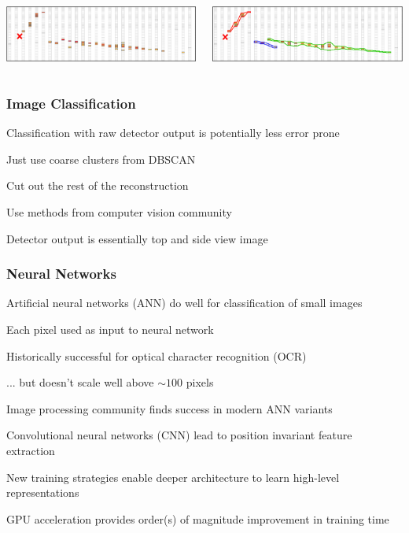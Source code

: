 \documentclass[10pt,professionalfonts,xcolor=table]{beamer}
\begin{document}
\begin{frame}
\begin{columns}[c]
\includegraphics[width=\textwidth]{figures/evd_steps/vertex.png}

\includegraphics[width=\textwidth]{figures/evd_steps/prongs.png}

\end{columns}


\end{frame}

\begin{frame}
\frametitle{Image Classification}
  \bangon
  \item Classification with raw detector output is potentially less error prone
  \bangon
  \item Just use coarse clusters from DBSCAN
  \item Cut out the rest of the reconstruction
  \bangoff
  \gap
  \item Use methods from computer vision community
  \bangon
  \item Detector output is essentially top and side view image
  \bangoff
  \bangoff
\end{frame}

\begin{frame}
\frametitle{Neural Networks}
  \bangon
  \bang Artificial neural networks (ANN) do well for classification of small images
    \bangon
    \item Each pixel used as input to neural network
    \item Historically successful for optical character recognition (OCR)
    \item[] ... but doesn't scale well above $\sim 100$ pixels
    \bangoff
  \gap
  \item Image processing community finds success in modern ANN variants
    \bangon
    \item Convolutional neural networks (CNN) lead to position invariant feature extraction
    \item New training strategies enable deeper architecture to learn high-level representations
    \item GPU acceleration provides order(s) of magnitude improvement in training time
    \bangoff
  \bangoff

\end{frame}
\end{document}

